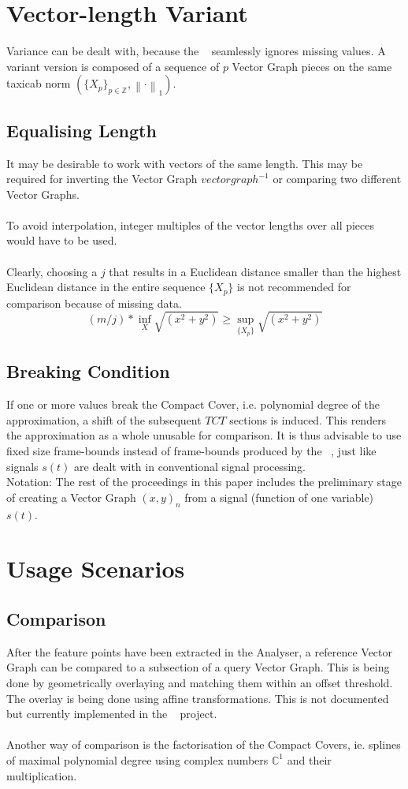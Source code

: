 \documentclass{report}
\newcommand\norm[1]{\left\lVert#1\right\rVert}
\begin{document}
\chapter{Vector-length Variant}
Variance can be dealt with, because the ~\cite[Stopeight\_Analyzer.tex]{Analyzer} seamlessly ignores missing values. A variant version is composed of a sequence of $p$ Vector Graph pieces on the same taxicab norm $(\{X_{p}\}_{p\in \mathbb{Z}},\norm{\cdot}_1)$.
\section{Equalising Length}
It may be desirable to work with vectors of the same length. This may be required for inverting the Vector Graph $vectorgraph^{-1}$ or comparing two different Vector Graphs.\\\\
To avoid interpolation, integer multiples of the vector lengths over all pieces would have to be used.\\\\
Clearly, choosing a $j$ that results in a Euclidean distance smaller than the highest Euclidean distance in the entire sequence $\{X_{p}\}$ is not recommended for comparison because of missing data.
\begin{equation}
(m/j)*\inf \limits _{X} \sqrt{(x^2+y^2)} \geq \sup \limits _{\{X_{p}\}} \sqrt{(x^2+y^2)}\label{eq:4}
\end{equation}
\section{Breaking Condition}
If one or more values break the Compact Cover, i.e. polynomial degree of the approximation, a shift of the subsequent $TCT$ sections is induced. This renders the approximation as a whole unusable for comparison. It is thus advisable to use fixed size frame-bounds instead of frame-bounds produced by the ~\cite[Stopeight\_Analyzer.tex]{Analyzer}, just like signals $s(t)$ are dealt with in conventional signal processing.\\
Notation: The rest of the proceedings in this paper includes the preliminary stage of creating a Vector Graph $(x,y)_{n}$ from a signal (function of one variable) $s(t)$. 

\chapter{Usage Scenarios}
\section*{Comparison}
After the feature points have been extracted in the Analyser, a reference Vector Graph can be compared to a subsection of a query Vector Graph. This is being done by geometrically overlaying and matching them within an offset threshold. The overlay is being done using affine transformations. This is not documented but currently implemented in the ~\cite[Stopeight\_Comparator.tex]{Comparator} project.\\\\
Another way of comparison is the factorisation of the Compact Covers, ie. splines of maximal polynomial degree using complex numbers $\mathbb{C}^1$ and their multiplication.
\end{document}
